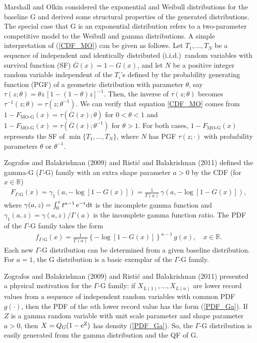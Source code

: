 \documentclass[12pt,a4paper]{article} %
\begin{document}
Marshall and Olkin considered the exponential and Weibull distributions for the baseline G and derived some
structural properties of the generated distributions. The special case that G is an exponential distribution
refers to a two-parameter competitive model to the Weibull and gamma distributions.
A simple interpretation of (\ref{CDF_MO}) can be given as follows. Let $T_1,\ldots,T_N$ be a sequence
of independent and identically distributed (i.i.d.)~random variables with survival function (SF)
$\overline{G}(x)=1-G(x)$, and let $N$ be a positive integer
random variable independent of the $T_i$'s defined by the probability generating function (PGF) of a
geometric distribution with parameter $\theta$, say $\tau(z;\theta)=\theta z\,[1-(1-\theta)z]^{-1}$.
Then, the inverse of $\tau(z;\theta)$ becomes $\tau^{-1}(z;\theta)=\tau(z;\theta^{-1})$. We can verify that
equation \eqref{CDF_MO} comes from $1 - F_{\text{MO-G}}(x)=\tau(\overline{G}(x);\theta)$ for $0<\theta<1$ and
$1-F_{\text{MO-G}}(x)=\tau(\overline{G}(x);\theta^{-1})$ for $\theta>1$. For both cases, $1-F_{\text{MO-G}}(x)$
re\-presents the SF of $\min\{T_1,\ldots,T_N\}$, where $N$ has
PGF $\tau(z;\cdot)$ with probability parameters $\theta$ or $\theta^{-1}$.

Zografos and Balakrishnan (2009) and Risti\'{c} and Balakrishnan (2011)
defined the gamma-G ($\Gamma$-G) family with an extra shape parameter $a>0$ by
the CDF (for $x \in \mathbb{R}$)
\begin{eqnarray}\label{CDF_Ga}
F_{\Gamma\text{-G}}(x)=\gamma_1\left( a, -\log \left[1-G(x)\right]\right)
=\frac{\displaystyle 1}{\displaystyle \Gamma(a)}\,\gamma\left( a, -\log \left[1-G(x)\right]\right),
\end{eqnarray}
where $\gamma(a,z)=\int_0^{z} t^{a-1}\,\rm{e}^{-t}dt$ is the incomplete gamma function and
 $\gamma_1(a,z)= \gamma(a,z)/\Gamma(a)$ is the incomplete gamma function ratio.
The PDF of the $\Gamma$-G family takes the form
\begin{eqnarray}\label{PDF_Ga}
\displaystyle
f_{\Gamma\text{-G}}(x)=\frac{\displaystyle 1}{\displaystyle \Gamma(a)} \left\{ -\log[1-G(x)] \right\}^{a-1}\, g(x),
\quad x \in \mathbb{R}.
\end{eqnarray}
Each new $\Gamma$-G distribution can be determined from a given baseline distribution.
For $a=1$, the G distribution is a basic exemplar of the $\Gamma$-G family.

Zografos and Balakrishnan (2009) and Risti\'{c} and Balakrishnan (2011)
presented a physical motivation for the $\Gamma$-G family: if $X_{L(1)},\ldots, X_{L(n)}$ are lower record values
from a sequence of independent random variables with common PDF $g (\cdot)$, then the PDF of the $n$th lower
record value has the form (\ref{PDF_Ga}). If $Z$ is a gamma random variable with unit scale
parameter and shape parameter $a>0$, then $X=Q_G(1-\rm{e}^{Z})$ has density (\ref{PDF_Ga}). So,
the $\Gamma$-G distribution is easily generated from the gamma distribution and the QF of G.
\end{document}
